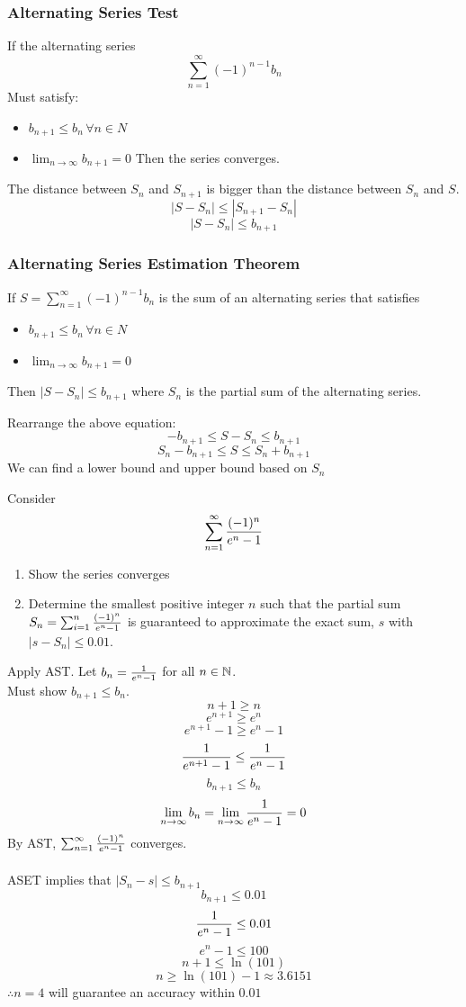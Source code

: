 \documentclass[english, 12pt]{article}
\begin{document}
\subsubsection{Alternating Series Test}
If the alternating series
\[ \sum_{n=1}^\infty (-1)^{n-1} b_{n} \]
Must satisfy:
\begin{itemize}
\item $b_{n+1} \leq b_{n}\, \forall n \in N$
\item $\lim_{n\to\infty} b_{n+1} = 0$
Then the series converges.
\end{itemize}
The distance between $S_{n}$ and $S_{n+1}$ is bigger than the distance between $S_{n}$ and $S$.
\[ |S-S_{n}| \leq |S_{n+1} - S_{n}|\]
\[ |S-S_{n}| \leq b_{n+1}\]
\subsubsection*{Alternating Series Estimation Theorem}
If $S = \sum_{n=1}^\infty (-1)^{n-1} b_{n}$ is the sum of an alternating series that satisfies 
\begin{itemize}
\item $b_{n+1} \leq b_{n}\, \forall n \in N$
\item $\lim_{n\to\infty} b_{n+1} = 0$
\end{itemize}
Then $|S-S_{n}| \leq b_{n+1}$ where $S_{n}$ is the partial sum of the alternating series.
\begin{rem}
Rearrange the above equation:
\[ -b_{n+1} \leq S-S_{n} \leq b_{n+1} \]
\[ S_{n} -b_{n+1} \leq S \leq S_{n} + b_{n+1} \]
We can find a lower bound and upper bound based on $S_{n}$
\end{rem}
\begin{exmp}
Consider 
\[\sum_{n=1}^\infty \frac{(-1)^n}{e^n-1} \]
\begin{enumerate}
\item Show the series converges
\item Determine the smallest positive integer $n$ such that the partial sum $S_{n} = \sum_{i=1}^n \frac{(-1)^n}{e^n-1}$ is guaranteed to approximate the exact sum, $s$ with $|s-S_{n}| \leq 0.01$.
\end{enumerate}
\begin{sol}
Apply AST. Let $b_{n} = \frac{1}{e^n-1}$ for all $n \in {\mathbb{N}}$.\\
Must show $b_{n+1} \leq b_{n}$.
\[ n+1 \geq n \]
\[ e^{n+1} \geq e^{n} \]
\[ e^{n+1} - 1 \geq e^{n} - 1 \]
\[ \frac{1}{e^{n+1} - 1} \leq \frac{1}{e^{n} - 1} \]
\[ b_{n+1} \leq b_{n} \]
\[\lim_{n\to\infty} b_{n} = \lim_{n\to\infty} \frac{1}{e^n-1} = 0 \]
By AST, $\sum_{n=1}^\infty \frac{(-1)^n}{e^n-1}$ converges.\\\\
ASET implies that $|S_{n} - s| \leq b_{n+1}$
\[b_{n+1} \leq 0.01 \]
\[\frac{1}{e^n-1} \leq 0.01 \]
\[e^n-1 \leq 100 \]
\[ n+1 \leq \ln(101) \]
\[ n \geq \ln(101)-1 \approx 3.6151 \]
$\therefore n=4$ will guarantee an accuracy within $0.01$
\end{sol}
\end{exmp}
\end{document}
